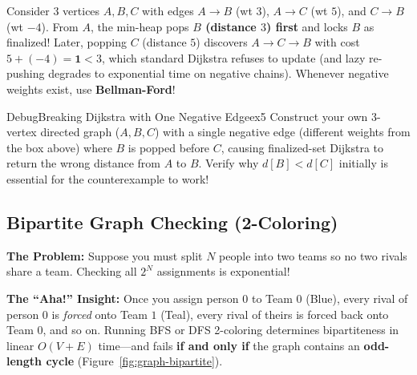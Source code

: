 \documentclass[11pt,a4paper]{article}
\theoremstyle{definition}
\newcommand{\painbeat}{\textbf{\color{accentamber}The Problem:} }
\newcommand{\ahabeat}{\textbf{\color{accentteal}The ``Aha!'' Insight:} }
\begin{document}
\begin{watchoutbox}
Consider $3$ vertices $A, B, C$ with edges $A \to B$ (wt $3$), $A \to C$ (wt $5$), and $C \to B$ (wt $-4$). From $A$, the min-heap pops \textbf{$B$ (distance $3$) first} and locks $B$ as finalized! Later, popping $C$ (distance $5$) discovers $A \to C \to B$ with cost $5 + (-4) = \mathbf{1} < 3$, which standard Dijkstra refuses to update (and lazy re-pushing degrades to exponential time on negative chains). Whenever negative weights exist, use \textbf{Bellman-Ford}!
\end{watchoutbox}

\begin{tryitbox}{Debug}{Breaking Dijkstra with One Negative Edge}{ex5}
Construct your own 3-vertex directed graph ($A, B, C$) with a single negative edge (different weights from the box above) where $B$ is popped before $C$, causing finalized-set Dijkstra to return the wrong distance from $A$ to $B$. Verify why $d[B] < d[C]$ initially is essential for the counterexample to work!
\end{tryitbox}

\subsection{Bipartite Graph Checking (2-Coloring)}

\painbeat Suppose you must split $N$ people into two teams so no two rivals share a team. Checking all $2^N$ assignments is exponential!

\ahabeat Once you assign person $0$ to Team $0$ (Blue), every rival of person $0$ is \emph{forced} onto Team $1$ (Teal), every rival of theirs is forced back onto Team $0$, and so on. Running BFS or DFS 2-coloring determines bipartiteness in linear $O(V + E)$ time---and fails \textbf{if and only if} the graph contains an \textbf{odd-length cycle} (Figure~\ref{fig:graph-bipartite}).
\end{document}
